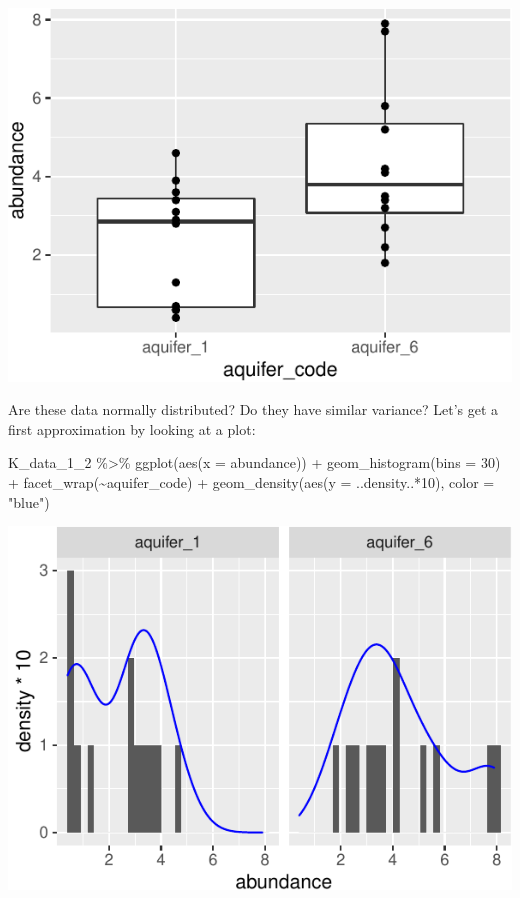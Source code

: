 \documentclass[
]{krantz}
\newenvironment{Shaded}{\begin{snugshade}}{\end{snugshade}}
\newcommand{\AttributeTok}[1]{\textcolor[rgb]{0.77,0.63,0.00}{#1}}
\newcommand{\DecValTok}[1]{\textcolor[rgb]{0.00,0.00,0.81}{#1}}
\newcommand{\FunctionTok}[1]{\textcolor[rgb]{0.00,0.00,0.00}{#1}}
\newcommand{\NormalTok}[1]{#1}
\newcommand{\SpecialCharTok}[1]{\textcolor[rgb]{0.00,0.00,0.00}{#1}}
\newcommand{\StringTok}[1]{\textcolor[rgb]{0.31,0.60,0.02}{#1}}
\begin{document}
\begin{center}\includegraphics[width=1\linewidth]{index_files/figure-latex/unnamed-chunk-139-1} \end{center}

Are these data normally distributed? Do they have similar variance? Let's get a first approximation by looking at a plot:

\begin{Shaded}
\begin{Highlighting}[]
\NormalTok{K\_data\_1\_2 }\SpecialCharTok{\%\textgreater{}\%}
  \FunctionTok{ggplot}\NormalTok{(}\FunctionTok{aes}\NormalTok{(}\AttributeTok{x =}\NormalTok{ abundance)) }\SpecialCharTok{+} 
    \FunctionTok{geom\_histogram}\NormalTok{(}\AttributeTok{bins =} \DecValTok{30}\NormalTok{) }\SpecialCharTok{+}
    \FunctionTok{facet\_wrap}\NormalTok{(}\SpecialCharTok{\textasciitilde{}}\NormalTok{aquifer\_code) }\SpecialCharTok{+}
    \FunctionTok{geom\_density}\NormalTok{(}\FunctionTok{aes}\NormalTok{(}\AttributeTok{y =}\NormalTok{ ..density..}\SpecialCharTok{*}\DecValTok{10}\NormalTok{), }\AttributeTok{color =} \StringTok{"blue"}\NormalTok{)}
\end{Highlighting}
\end{Shaded}

\begin{center}\includegraphics[width=1\linewidth]{index_files/figure-latex/unnamed-chunk-140-1} \end{center}
\end{document}
